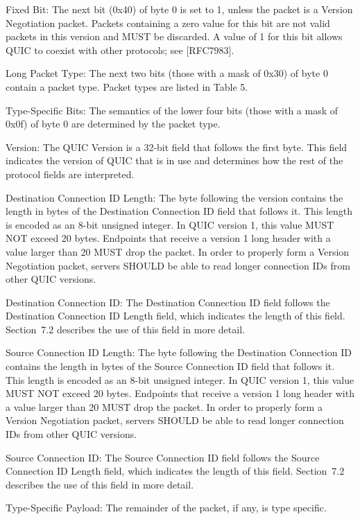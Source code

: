\documentclass{article}
\begin{document}
Fixed Bit:  The next bit (0x40) of byte 0 is set to 1, unless the packet is a Version Negotiation packet.  Packets containing a zero value for this bit are not valid packets in this version and MUST be discarded.  A value of 1 for this bit allows QUIC to coexist with other protocols; see [RFC7983].

Long Packet Type:  The next two bits (those with a mask of 0x30) of byte 0 contain a packet type.  Packet types are listed in Table 5.

Type-Specific Bits:  The semantics of the lower four bits (those with a mask of 0x0f) of byte 0 are determined by the packet type.

Version:  The QUIC Version is a 32-bit field that follows the first byte.  This field indicates the version of QUIC that is in use and determines how the rest of the protocol fields are interpreted.

Destination Connection ID Length:  The byte following the version contains the length in bytes of the Destination Connection ID field that follows it.  This length is encoded as an 8-bit unsigned integer.  In QUIC version 1, this value MUST NOT exceed 20 bytes.  Endpoints that receive a version 1 long header with a value larger than 20 MUST drop the packet.  In order to properly form a Version Negotiation packet, servers SHOULD be able to read longer connection IDs from other QUIC versions.

Destination Connection ID:  The Destination Connection ID field follows the Destination Connection ID Length field, which indicates the length of this field.  Section~7.2 describes the use of this field in more detail.

Source Connection ID Length:  The byte following the Destination Connection ID contains the length in bytes of the Source Connection ID field that follows it.  This length is encoded as an 8-bit unsigned integer.  In QUIC version 1, this value MUST NOT exceed 20 bytes.  Endpoints that receive a version 1 long header with a value larger than 20 MUST drop the packet.  In order to properly form a Version Negotiation packet, servers SHOULD be able to read longer connection IDs from other QUIC versions.

Source Connection ID:  The Source Connection ID field follows the Source Connection ID Length field, which indicates the length of this field.  Section~7.2 describes the use of this field in more detail.

Type-Specific Payload:  The remainder of the packet, if any, is type specific.
\end{document}
